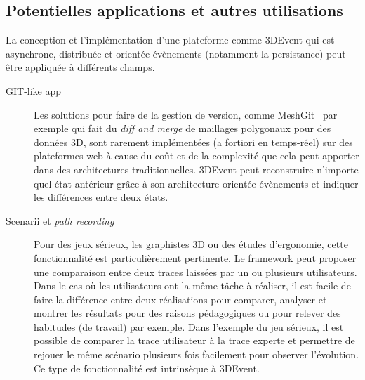 \subsection{Potentielles applications et autres utilisations}
La conception et l'implémentation d'une plateforme comme 3DEvent qui est 
asynchrone, distribuée et orientée évènements  (notamment la persistance) peut 
être appliquée à différents champs.
\begin{description}
	\item[GIT-like app] Les solutions pour faire de la gestion de version, comme 
	MeshGit~\cite{Denning2013} par exemple qui fait du
	\textit{diff and merge} de maillages polygonaux pour des données 3D, 
	sont rarement implémentées (a fortiori en 
	temps-réel) sur des plateformes web à cause du coût et de la complexité que 
	cela peut apporter dans des architectures traditionnelles. 3DEvent peut 
	reconstruire n'importe quel état antérieur grâce à son architecture orientée 
	évènements et indiquer les différences entre deux états.
	
	\item[Scenarii et \textit{path recording}] Pour des jeux sérieux, les graphistes 
	3D ou des études d'ergonomie, cette fonctionnalité est particulièrement 
	pertinente. Le \gls{framework} peut proposer une comparaison entre deux traces 
	laissées par un ou plusieurs utilisateurs. Dans le cas où les utilisateurs ont la 
	même tâche à réaliser, il est facile de faire la différence entre deux réalisations 
	pour comparer, analyser et montrer les résultats	pour des raisons 
	pédagogiques ou pour relever des habitudes (de travail) par exemple. Dans 
	l'exemple du jeu sérieux, il est possible de comparer la trace utilisateur à la trace experte 
	et permettre de rejouer le même scénario plusieurs fois facilement pour 
	observer l'évolution. Ce type de fonctionnalité est intrinsèque à 3DEvent. 
	

\end{description}
